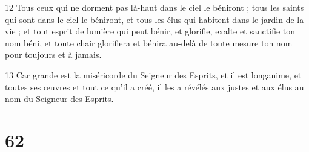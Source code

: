 \par 12 Tous ceux qui ne dorment pas là-haut dans le ciel le béniront ; tous les saints qui sont dans le ciel le béniront, et tous les élus qui habitent dans le jardin de la vie ; et tout esprit de lumière qui peut bénir, et glorifie, exalte et sanctifie ton nom béni, et toute chair glorifiera et bénira au-delà de toute mesure ton nom pour toujours et à jamais.
\par 13 Car grande est la miséricorde du Seigneur des Esprits, et il est longanime, et toutes ses œuvres et tout ce qu'il a créé, il les a révélés aux justes et aux élus au nom du Seigneur des Esprits.

\chapter{62}


